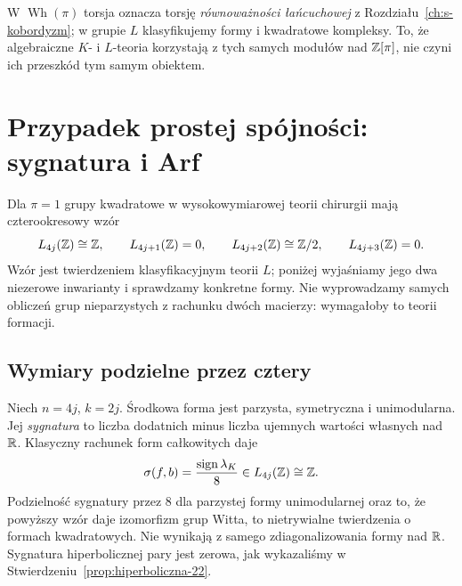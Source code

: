 \begin{uwaga}
W $\operatorname{Wh}(\pi)$ torsja oznacza torsję
\emph{równoważności łańcuchowej} z
Rozdziału~\ref{ch:s-kobordyzm}; w grupie $L$
klasyfikujemy formy i kwadratowe kompleksy.
To, że algebraiczne $K$- i $L$-teoria korzystają
z tych samych modułów nad $\mathbb{Z}[\pi]$, nie czyni
ich przeszkód tym samym obiektem.
\end{uwaga}

\section{Przypadek prostej spójności: sygnatura i Arf}
\label{sec:obliczenia-LZ-22}

Dla $\pi=1$ grupy kwadratowe w wysokowymiarowej
teorii chirurgii mają czterookresowy wzór
\begin{equation}\label{eq:L-Z-22}
 L_{4j}(\mathbb{Z})\cong\mathbb{Z},\qquad
 L_{4j+1}(\mathbb{Z})=0,\qquad
 L_{4j+2}(\mathbb{Z})\cong\mathbb{Z}/2,\qquad
 L_{4j+3}(\mathbb{Z})=0.
\end{equation}
Wzór jest twierdzeniem klasyfikacyjnym teorii $L$;
poniżej wyjaśniamy jego dwa niezerowe inwarianty
i sprawdzamy konkretne formy. Nie wyprowadzamy
samych obliczeń grup nieparzystych z rachunku
dwóch macierzy: wymagałoby to teorii formacji.

\subsection*{Wymiary podzielne przez cztery}
Niech $n=4j$, $k=2j$. Środkowa forma jest
parzysta, symetryczna i unimodularna.
Jej \emph{sygnatura} to liczba dodatnich minus
liczba ujemnych wartości własnych nad $\mathbb{R}$.
Klasyczny rachunek form całkowitych daje
\[
 \sigma(f,b)=\frac{\operatorname{sign}\lambda_K}{8}
       \in L_{4j}(\mathbb{Z})\cong\mathbb{Z}.
\]
Podzielność sygnatury przez $8$ dla parzystej
formy unimodularnej oraz to, że powyższy wzór
daje izomorfizm grup Witta, to nietrywialne
twierdzenia o formach kwadratowych. Nie wynikają
z samego zdiagonalizowania formy nad $\mathbb{R}$.
Sygnatura hiperbolicznej pary jest zerowa, jak
wykazaliśmy w Stwierdzeniu~\ref{prop:hiperboliczna-22}.

